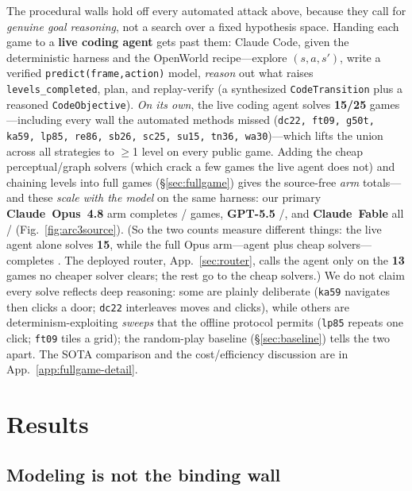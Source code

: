 \documentclass[11pt]{article}
\begin{document}
\label{sec:agent}
The procedural walls hold off every automated attack above, because they call for \emph{genuine goal
reasoning}, not a search over a fixed hypothesis space. Handing each game to a \textbf{live coding agent}
gets past them: Claude Code, given the deterministic harness and the OpenWorld recipe---explore
$(s,a,s')$, write a verified \texttt{predict(frame,action)} model, \emph{reason} out what raises
\texttt{levels\_completed}, plan, and replay-verify (a synthesized \texttt{CodeTransition} plus a
reasoned \texttt{CodeObjective}). \emph{On its own}, the live coding agent solves \textbf{15/25} games---including every wall the
automated methods missed (\texttt{dc22, ft09, g50t, ka59, lp85, re86, sb26, sc25, su15, tn36,
wa30})---which lifts the union across all strategies to $\geq$1 level on every public game. Adding the
cheap perceptual/graph solvers (which crack a few games the live agent does not) and chaining levels into
full games (\S\ref{sec:fullgame}) gives the source-free \emph{arm} totals---and these \emph{scale with the
model} on the same harness: our primary \textbf{Claude~Opus~4.8} arm completes
\ArcSFGames/\ArcUnionGames{} games, \textbf{GPT-5.5} \ArcCodexFreeFull/\ArcUnionGames{}, and
\textbf{Claude~Fable} all \ArcFableFull/\ArcUnionGames{} (Fig.~\ref{fig:arc3source}). (So the two counts
measure different things: the live agent alone solves \textbf{15}, while the full Opus arm---agent plus
cheap solvers---completes \textbf{\ArcSFGames{}}. The deployed router, App.~\ref{sec:router}, calls the
agent only on the \textbf{13} games no cheaper solver clears; the rest go to the cheap solvers.) We do not claim every solve reflects deep
reasoning: some are plainly deliberate (\texttt{ka59} navigates then clicks a door; \texttt{dc22}
interleaves moves and clicks), while others are determinism-exploiting \emph{sweeps} that the offline protocol permits
(\texttt{lp85} repeats one click; \texttt{ft09} tiles a grid); the random-play baseline
(\S\ref{sec:baseline}) tells the two apart. The SOTA comparison and the cost/efficiency discussion are in
App.~\ref{app:fullgame-detail}.

\section{Results}
\label{sec:results}
\subsection{Modeling is not the binding wall}
\end{document}
